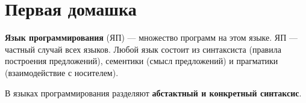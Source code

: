 


\usepackage{fancyvrb}
\usepackage{fvextra}

\usepackage[scr=rsfs]{mathalpha}

\newcommand{\Lang}{\mathscr{L}}
\newcommand{\Lother}{\mathscr{M}} %
\newcommand{\Lexpr}{\mathscr{E}}  %
\newcommand{\Lstat}{\mathscr{S}}  %
\newcommand{\Linst}{\mathscr{I}}  %
\newcommand{\Lprog}{\mathscr{P}}  %

\newcommand{\Conf}{\mathscr{C}} %
\newcommand{\Word}{\mathscr{W}} %
\newcommand{\Var}{\mathscr{X}}  %

\newcommand{\neatarrow}{\DOTSB\Rightarrow}

\newcommand{\semant}[1]{\llbracket #1 \rrbracket}

\newcommand{\kIf}{\mathop{\mathbf{if}}}
\newcommand{\kFi}{\mathop{\mathbf{fi}}}
\newcommand{\kThen}{\mathop{\mathbf{then}}}
\newcommand{\kElse}{\mathop{\mathbf{else}}}
\newcommand{\kWhile}{\mathop{\mathbf{while}}}
\newcommand{\kDo}{\mathop{\mathbf{do}}}
\newcommand{\kOd}{\mathop{\mathbf{od}}}
\newcommand{\eof}{\mathrm{eof}}

\newcommand{\CJMPzp}{\mathord{\mathbf{CJMP}}^+_z}
\newcommand{\CJMPnp}{\mathord{\mathbf{CJMP}}^+_{nz}}
\newcommand{\CJMPzn}{\mathord{\mathbf{CJMP}}^-_z}
\newcommand{\CJMPnn}{\mathord{\mathbf{CJMP}}^-_{nz}}
\newcommand{\JMP}{\mathord{\mathbf{JMP}}}
\newcommand{\LABEL}{\mathord{\mathbf{LABEL}}}



\section{Первая домашка}

\textbf{Язык программирования} (ЯП) --- множество программ на этом языке. ЯП
--- частный случай всех языков. Любой язык состоит из синтаксиста (правила
построения предложений), сементики (смысл предложений) и прагматики
(взаимодействие с носителем).

В языках программирования разделяют \textbf{абстактный и конкретный синтаксис}.

